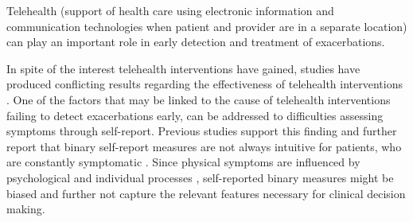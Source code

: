 %
%

Telehealth (support of health care using electronic information and communication technologies when patient and provider are in a separate location) can play an important role in early detection and treatment of exacerbations. 

In spite of the interest telehealth interventions have gained, studies have produced conflicting results regarding the effectiveness of telehealth interventions \citep{pedone}. One of the factors that may be linked to the cause of telehealth interventions failing to detect exacerbations early, can be addressed to difficulties assessing symptoms through self-report. Previous studies support this finding and further report that binary self-report measures are not always intuitive for patients, who are constantly symptomatic \citep{pedone}. Since physical symptoms are influenced by psychological and individual processes \citep{pennebakker}, self-reported binary measures might be biased and further not capture the relevant features necessary for clinical decision making.  


%
%

%
%


